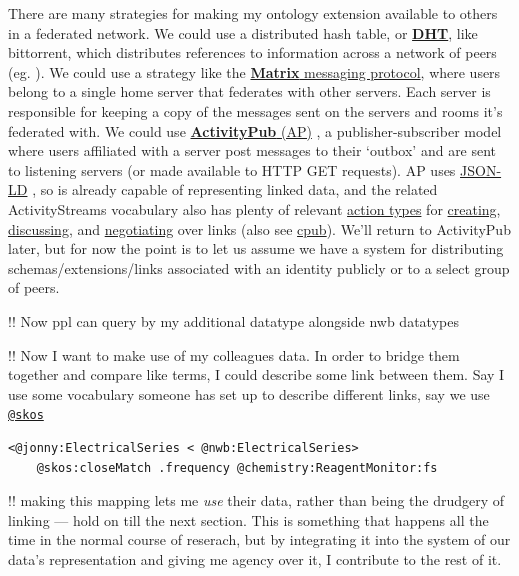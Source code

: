 \documentclass[11pt]{article}
\begin{document}
\begin{multicols}{2}
There are many strategies for making my ontology extension available to
others in a federated network. We could use a distributed hash table, or
\href{https://en.wikipedia.org/wiki/Distributed_hash_table}{\textbf{DHT}},
like bittorrent, which distributes references to information across a
network of peers (eg. \cite{pirroDHTbasedSemanticOverlay2012} ).
We could use a strategy like the
\href{https://matrix.org/}{\textbf{Matrix} messaging protocol}, where
users belong to a single home server that federates with other servers.
Each server is responsible for keeping a copy of the messages sent on
the servers and rooms it's federated with. We could use
\href{https://www.w3.org/TR/2018/REC-activitypub-20180123/}{\textbf{ActivityPub}
(AP)} \cite{Webber:18:A} , a publisher-subscriber model where
users affiliated with a server post messages to their `outbox' and are
sent to listening servers (or made available to HTTP GET requests). AP
uses \href{https://json-ld.org/}{JSON-LD} \cite{spornyJSONLDJSONbasedSerialization2020} , so is already capable of
representing linked data, and the related ActivityStreams vocabulary
\cite{snellActivityStreams2017}  also has plenty of relevant
\href{https://www.w3.org/TR/activitystreams-vocabulary/\#activity-types}{action
types} for
\href{https://www.w3.org/TR/activitystreams-vocabulary/\#dfn-create}{creating},
\href{https://www.w3.org/TR/activitystreams-vocabulary/\#dfn-question}{discussing},
and
\href{https://www.w3.org/TR/activitystreams-vocabulary/\#dfn-tentativeaccept}{negotiating}
over links (also see
\href{https://github.com/openEngiadina/cpub}{cpub}). We'll return to
ActivityPub later, but for now the point is to let us assume we have a
system for distributing schemas/extensions/links associated with an
identity publicly or to a select group of peers.

!! Now ppl can query by my additional datatype alongside nwb datatypes

!! Now I want to make use of my colleagues data. In order to bridge them
together and compare like terms, I could describe some link between
them. Say I use some vocabulary someone has set up to describe different
links, say we use
\href{https://www.w3.org/2009/08/skos-reference/skos.html}{\texttt{@skos}}

\begin{verbatim}
<@jonny:ElectricalSeries < @nwb:ElectricalSeries>
    @skos:closeMatch .frequency @chemistry:ReagentMonitor:fs
\end{verbatim}

!! making this mapping lets me \emph{use} their data, rather than being
the drudgery of linking --- hold on till the next section. This is
something that happens all the time in the normal course of reserach,
but by integrating it into the system of our data's representation and
giving me agency over it, I contribute to the rest of it.


\end{multicols}
\end{document}
